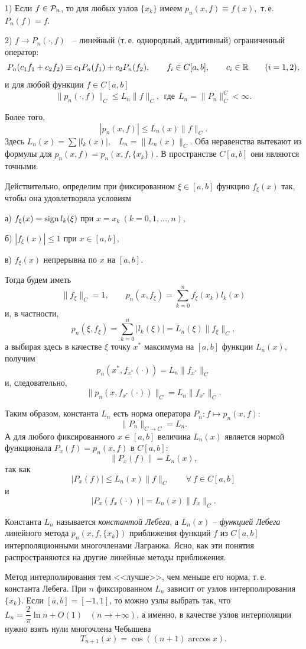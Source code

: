 1) {Если} $f \in \mathcal{P}_n$, то для любых узлов $\{x_k\}$
имеем $p_n(x,f)\equiv f(x),$ т.\,е. $P_{n}(f)=f.$

2) $f \to P_n(\cdot,f)$
~-- линейный (т.\,е. однородный, аддитивный) ограниченный оператор:
$$
  P_n(c_1f_1+c_2f_2) \equiv c_1P_n(f_1)+c_2P_n(f_2),\qquad
  f_i\in C[a,b],\qquad c_i\in \mathbb{R}\qquad (i=1,2),
$$
и для любой функции
$f\in C[a,b]$
$$
  \|p_n(\cdot,f)\|_C \le L_n\|f\|_C,\ \ \mbox{где}\ \
  L_n=\|P_n\|_C^C<\infty.
$$

Более того,
$$
|p_n(x,f)| \le L_n(x)\|f\|_C.
$$
Здесь $L_n(x)=\sum{|l_k(x)|},$~ $L_n =
\|L_n(x)\|_C$. Оба неравенства вытекают из формулы для $p_n(x, f) = p_n(x,f,\{x_k\})$. В
пространстве $C[a,b]$ они являются точными.

{Действительно, определим
при фиксированном $\xi \in [a,b]$ функцию $f_\xi(x)$ так,
чтобы она удовлетворяла условиям}

{а) $f_\xi(x)={\rm sign \, }{l_k(\xi)}$ при $x=x_k\  ( k=0,1,\ldots,n)$,}

{б) $|f_\xi(x)| \le 1$ при $x \in [a,b]$,}

{в) $f_\xi(x)$ непрерывна по $x$ на $[a,b]$.}

{Тогда будем иметь
$$
\|f_\xi\|_C=1,
\qquad  p_n(x, f_\xi) = \sum\limits^n_{k=0}{f_\xi(x_k)l_k(x)}
$$
и, в частности,
$$
  p_n(\xi, f_\xi) = \sum\limits^n_{k=0}{|l_k(\xi)|} =
  L_n(\xi)\|f_\xi\|_C,
$$
а выбирая здесь в качестве $\xi$ точку $x^*$ максимума на $[a,b]$ функции $L_n(x)$,
получим
$$
  p_n(x^*,f_{x^*}(\cdot)) = L_n\|f_{x^*}\|_C
$$
и, следовательно,
$$
  \|p_n(x,f_{x^*}(\cdot))\|_C = L_n\|f_{x^*}\|_C.
$$}

{Таким образом, константа $L_n$ есть норма оператора $P_n\colon f \longmapsto p_n(x,f):$
$$
  \|P_n\|_{C \to C} = L_n.
$$
А для любого фиксированного $x \in [a,b]$ величина $L_n(x)$ является нормой функционала
$P_x(f)=p_n(x,f)$ в $C[a,b]$:
$$
\|P_x(f)\| = L_n(x),
$$
так как
$$
|P_x(f)| \le L_n(x)\|f\|_C\qquad \forall\ f \in C[a,b]
$$
и
$$
|P_x(f_x(\cdot))|=L_n(x)\|f_x\|_C.
$$}

{Константа $L_n$ называется \textit{константой Лебега}, а $L_n(x)$ --
\textit{функцией Лебега} линейного метода $p_n(x, f, \{x_k\})$ приближения функций $f$ из
$C[a,b]$ интерполяционными многочленами Лагранжа. Ясно, как эти понятия распространяются
на другие линейные методы приближения.}

{Метод интерполирования тем <<лучше>>, чем меньше его норма, т.\,е. константа Лебега. При
$n$ фиксированном $L_n$ зависит от узлов интерполирования $\{x_k\}$. Если $[a,b]=[-1,1]$,
то можно узлы выбрать так, что $L_n=\dfrac{2}{\pi}\ln{n} + O(1)$~ $(n \to +\infty)$, а
именно, в качестве узлов интерполяции нужно взять нули многочлена Чебышева
$$
T_{n+1}(x)=\cos({(n+1)}\arccos{x}).
$$}

